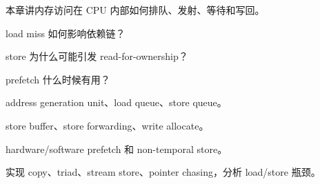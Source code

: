 {本章讲内存访问在 CPU 内部如何排队、发射、等待和写回。}
{\item load miss 如何影响依赖链？
\item store 为什么可能引发 read-for-ownership？
\item prefetch 什么时候有用？}
{\item address generation unit、load queue、store queue。
\item store buffer、store forwarding、write allocate。
\item hardware/software prefetch 和 non-temporal store。}
{实现 copy、triad、stream store、pointer chasing，分析 load/store 瓶颈。}
